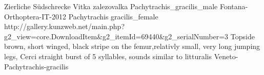 {Zierliche Südschrecke} %
{Vitka zalezovalka} %
{} %
{Pachytrachis_gracilis_male} %
{Fontana-Orthoptera-IT-2012}%
{Pachytrachis gracilis_female} %
{http://gallery.kunzweb.net/main.php?g2_view=core.DownloadItem&g2_itemId=69440&g2_serialNumber=3}
{Topside brown, short winged, black stripe on the femur,relativly small, very long jumping legs, Cerci straight} %
{burst of 5 syllables, sounds similar to litturalis} %
{Veneto-Pachytrachis-gracilis} %